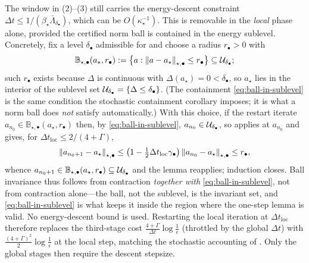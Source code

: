 \begin{remark}
\label{rem:local-restart}
The window in (2)--(3) still carries the energy-descent constraint
$\Delta t\leq1/(\beta_\star\bar\Lambda_{\delta_\bullet})$, which can be $O(\kappa_\star^{-1})$. This is
removable in the \emph{local} phase alone, provided the certified norm ball is contained in the energy
sublevel. Concretely, fix a level $\delta_\bullet$ admissible for  and
choose a radius $r_\bullet>0$ with
\begin{equation}
\label{eq:ball-in-sublevel}
    \mathbb B_{\star,\bullet}(a_\star,r_\bullet)
    :=\bigl\{a:\left\lVert a-a_\star\right\rVert_{\star,\bullet}\leq r_\bullet\bigr\}
    \subseteq\mathcal{U}_{\delta_\bullet};
\end{equation}
such $r_\bullet$ exists because $\Delta$ is continuous with $\Delta(a_\star)=0<\delta_\bullet$, so
$a_\star$ lies in the interior of the sublevel set $\mathcal{U}_{\delta_\bullet}=\{\Delta\leq\delta_\bullet\}$.
(The containment \eqref{eq:ball-in-sublevel} is the same condition the stochastic containment corollary
imposes; it is what a norm ball does \emph{not} satisfy automatically.) With this choice, if the
restart iterate $a_{n_0}\in\mathbb B_{\star,\bullet}(a_\star,r_\bullet)$ then, by
\eqref{eq:ball-in-sublevel}, $a_{n_0}\in\mathcal{U}_{\delta_\bullet}$, so 
applies at $a_{n_0}$ and gives, for $\Delta t_{\mathrm{loc}}\leq2/(4+\Gamma)$,
\[
    \left\lVert a_{n_0+1}-a_\star\right\rVert_{\star,\bullet}
    \leq\bigl(1-\tfrac12\Delta t_{\mathrm{loc}}\gamma_\bullet\bigr)\left\lVert a_{n_0}-a_\star\right\rVert_{\star,\bullet}
    \leq r_\bullet,
\]
whence $a_{n_0+1}\in\mathbb B_{\star,\bullet}(a_\star,r_\bullet)\subseteq\mathcal{U}_{\delta_\bullet}$ and the
lemma reapplies; induction closes. Ball invariance thus follows from contraction \emph{together with}
\eqref{eq:ball-in-sublevel}, not from contraction alone---the ball, not the sublevel, is the invariant
set, and \eqref{eq:ball-in-sublevel} is what keeps it inside the region where the one-step lemma is
valid. No energy-descent bound is used. Restarting the local iteration at $\Delta t_{\mathrm{loc}}$
therefore replaces the third-stage cost $\tfrac{4+\Gamma}{\Delta t}\log\tfrac1\epsilon$ (throttled by
the global $\Delta t$) with $\tfrac{(4+\Gamma)^2}2\log\tfrac1\epsilon$ at the local step, matching the
stochastic accounting of . Only the global stages then require the descent
stepsize.


\end{remark}
